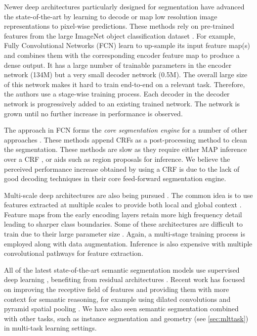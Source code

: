 Newer deep architectures \citep{long2015fully,NohDeconvNets,eigen2015predicting,DecoupledNet,CRFRNN} particularly designed for segmentation have advanced the state-of-the-art by learning to decode or map low resolution image representations to pixel-wise predictions. These methods rely on pre-trained features from the large ImageNet object classification dataset \citep{deng2009imagenet}. For example, Fully Convolutional Networks (FCN) \citep{long2015fully} learn to up-sample its input feature map(s) and combines them with the corresponding encoder feature map to produce a dense output. It has a large number of trainable parameters in the encoder network (134M) but a very small decoder network (0.5M). The overall large size of this network makes it hard to train end-to-end on a relevant task. Therefore, the authors use a stage-wise training process. Each decoder in the decoder network is progressively added to an existing trained network. The network is grown until no further increase in performance is observed. 

The approach in FCN forms the \textit{core segmentation engine} for a number of other approaches \citep{ParseNetRabinovich,UrtasunSegmentation,CRFRNN,chen2016deeplab}. These methods append CRFs as a post-processing method to clean the segmentation. These methods are slow as they require either MAP inference over a CRF \citep{lin2015efficient}, \citep{UrtasunSegmentation} or aids such as region proposals \citep{NohDeconvNets} for inference. We believe the perceived performance increase obtained by using a CRF is due to the lack of good decoding techniques in their core feed-forward segmentation engine. 

Multi-scale deep architectures are also being pursued \citep{eigen2015predicting,lin2015efficient,hariharan2015hypercolumns,ParseNetRabinovich}. The common idea is to use features extracted at multiple scales to provide both local and global context \citep{mostajabi2014feedforward}. Feature maps from the early encoding layers retain more high frequency detail leading to sharper class boundaries. Some of these architectures are difficult to train due to their large parameter size \citep{eigen2015predicting}. Again, a multi-stage training process is employed along with data augmentation. Inference is also expensive with multiple convolutional pathways for feature extraction.

All of the latest state-of-the-art semantic segmentation models use supervised deep learning \citep{badrinarayanan2017segnet,long2015fully}, benefiting from residual architectures \citep{he2016deep,huang2017densely}. Recent work has focused on improving the receptive field of features and providing them with more context for semantic reasoning, for example using dilated convolutions \citep{YuKoltun2016} and pyramid spatial pooling \citep{zhao2017pspnet}. We have also seen semantic segmentation combined with other tasks, such as instance segmentation \citep{he2017maskrcnn} and geometry (see \cref{sec:mlttask}) in multi-task learning settings.

